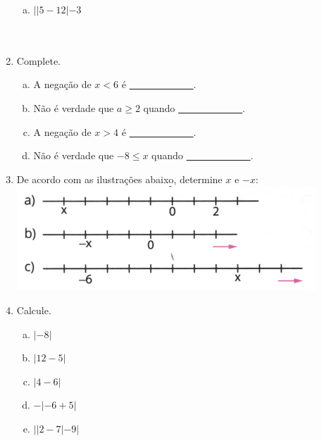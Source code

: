 \documentclass[a4paper,14pt]{article}
\begin{document}
\begin{multicols}{2}
\begin{enumerate}
\begin{enumerate}[a)]
				\item $||5 - 12| - 3$ \\\\\\
			\end{enumerate}
			\item Complete.
			\begin{enumerate}[a)]
				\item A negação de $x < 6$ é \underline{~~~~~~~~~~~~~}.
				\item Não é verdade que $a \geq 2$ quando \underline{~~~~~~~~~~~~~}.
				\item A negação de $x > 4$ é \underline{~~~~~~~~~~~~~}.
				\item Não é verdade que $-8 \leq x$ quando \underline{~~~~~~~~~~~~~}.
			\end{enumerate}
			\item De acordo com as ilustrações abaixo, determine $x$ e $-x$:
			\includegraphics[width=1.1\linewidth]{6FMA79_imagens/imagem1}
			\item Calcule.
			\begin{enumerate}[a)]
				\item $|-8|$
				\item $|12 - 5|$
				\item $|4 - 6|$
				\item $-|-6 + 5|$
				\item $||2 - 7| - 9|$
			\end{enumerate}
   		\end{enumerate}
        $~$ \\ $~$ \\ $~$ \\ $~$ \\ $~$ \\ $~$ \\ $~$ \\ $~$ \\ $~$ \\ $~$ \\ $~$ \\ $~$ \\ $~$ \\ $~$ \\ $~$ \\ $~$ \\ $~$ \\ $~$ \\ $~$ \\ $~$ \\ $~$ \\ $~$ \\ $~$ \\ $~$ \\
        \end{multicols}
\end{document}
